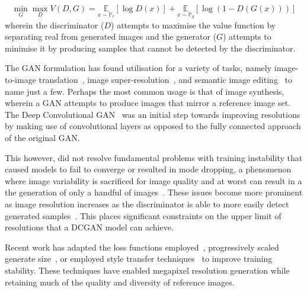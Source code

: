 \documentclass{article}
\begin{document}
\begin{equation} \label{eq:1}
\min_G \max_D V(D,G) = \underset{x \sim \mathbb P_{r}}{\mathbb E}[\log D(x)] + \underset{x \sim \mathbb P_{g}}{\mathbb E}[\log(1 - D(G(x)))]
\end{equation}
wherein the discriminator ($D$) attempts to maximise the value function by separating real from generated images and the generator ($G$) attempts to minimise it by producing samples that cannot be detected by the discriminator.

The GAN formulation has found utilisation for a variety of tasks, namely image-to-image translation~\cite{isolaImagetoImageTranslationConditional2018,zhuUnpairedImagetoImageTranslation2018}, image super-resolution~\cite{ledigPhotoRealisticSingleImage2017,youCTSuperresolutionGAN2020}, and semantic image editing~\cite{shenInterpretingLatentSpace2020} to name just a few. Perhaps the most common usage is that of image synthesis, wherein a GAN attempts to produce images that mirror a reference image set. The Deep Convolutional GAN~\cite{radfordUnsupervisedRepresentationLearning2016} was an initial step towards improving resolutions by making use of convolutional layers as opposed to the fully connected approach of the original GAN. 

This however, did not resolve fundamental problems with training instability that caused models to fail to converge or resulted in mode dropping, a phenomenon where image variability is sacrificed for image quality and at worst can result in a the generation of only a handful of images~\cite{arjovskyPrincipledMethodsTraining2017}. These issues become more prominent as image resolution increases as the discriminator is able to more easily detect generated samples~\cite{karrasProgressiveGrowingGANs2018}. This places significant constraints on the upper limit of resolutions that a DCGAN model can achieve.

Recent work has adapted the loss functions employed~\cite{arjovskyPrincipledMethodsTraining2017,maoLeastSquaresGenerative2017,gulrajaniImprovedTrainingWasserstein2017}, progressively scaled generate size~\cite{karrasProgressiveGrowingGANs2018}, or employed style transfer techniques~\cite{karrasStyleBasedGeneratorArchitecture2019,karrasAnalyzingImprovingImage2020} to improve training stability. These techniques have enabled megapixel resolution generation while retaining much of the quality and diversity of reference images. 
\end{document}
